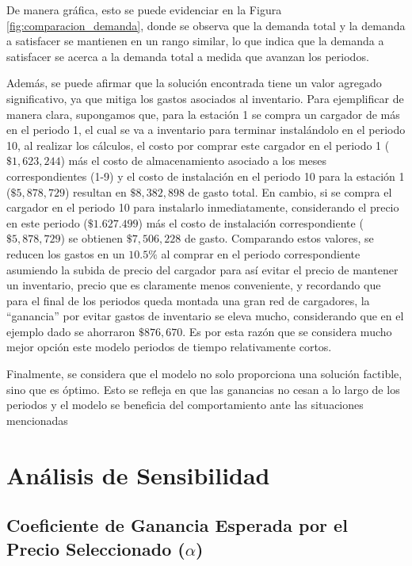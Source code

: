 \documentclass[letterpaper]{article}
\begin{document}
\begin{flushleft}
	De manera gráfica, esto se puede evidenciar en la Figura \ref{fig:comparacion_demanda}, donde se
	observa que la demanda total y la demanda a satisfacer se mantienen en un rango similar, lo que
	indica que la demanda a satisfacer se acerca a la demanda total a medida que avanzan los periodos.

	Además, se puede afirmar que la solución encontrada tiene un valor agregado significativo, ya
	que mitiga los gastos asociados al inventario. Para ejemplificar de manera clara, supongamos
	que, para la estación 1 se compra un cargador de más en el periodo 1, el cual se va a inventario
	para terminar instalándolo en el periodo 10, al realizar los cálculos, el costo por comprar
	este cargador en el periodo 1 ($\$1,623,244$) más el costo de almacenamiento asociado a los meses
		correspondientes (1-9) y el costo de instalación en el periodo 10 para la estación 1 ($\$5,878,729$)
		resultan en $\$8,382,898$ de gasto total. En cambio, si se compra el cargador en el periodo 10 para
		instalarlo inmediatamente, considerando el precio en este periodo ($\$1.627.499$) más el costo de
		instalación correspondiente ($\$5,878,729$) se obtienen $\$7,506,228$ de gasto. Comparando estos
		valores, se reducen los gastos en un $10.5\%$ al comprar en el periodo correspondiente asumiendo
		la subida de precio del cargador para así evitar el precio de mantener un inventario, precio
		que es claramente menos conveniente, y recordando que para el final de los periodos queda
		montada una gran red de cargadores, la “ganancia” por evitar gastos de inventario se eleva
		mucho, considerando que en el ejemplo dado se ahorraron $\$876,670$. Es por esta razón que se
		considera mucho mejor opción este modelo periodos de tiempo relativamente cortos.

		Finalmente, se considera que el modelo no solo proporciona una solución factible, sino que
		es óptimo. Esto se refleja en que las ganancias no cesan a lo largo de los periodos y el modelo
		se beneficia del comportamiento ante las situaciones mencionadas

	\section{Análisis de Sensibilidad}


	\subsection{Coeficiente de Ganancia Esperada por el Precio Seleccionado (\texorpdfstring{$\alpha$}{alpha})}


\end{flushleft}
\end{document}
